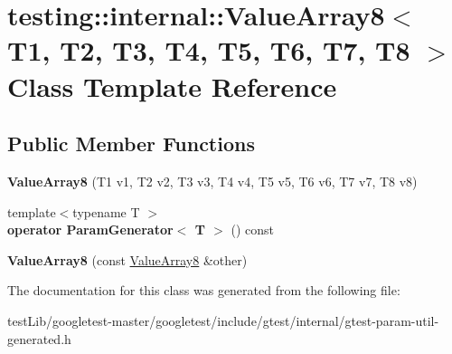 \hypertarget{classtesting_1_1internal_1_1ValueArray8}{}\section{testing\+:\+:internal\+:\+:Value\+Array8$<$ T1, T2, T3, T4, T5, T6, T7, T8 $>$ Class Template Reference}
\label{classtesting_1_1internal_1_1ValueArray8}
\subsection*{Public Member Functions}
\begin{DoxyCompactItemize}
\item 
\mbox{\label{classtesting_1_1internal_1_1ValueArray8_aa935d771149e26694277b6b9a3f6f5d3}} 
{\bfseries Value\+Array8} (T1 v1, T2 v2, T3 v3, T4 v4, T5 v5, T6 v6, T7 v7, T8 v8)
\item 
\mbox{\label{classtesting_1_1internal_1_1ValueArray8_a265f6e8bc6ceede7e673682ddebb82c5}} 
{\footnotesize template$<$typename T $>$ }\\{\bfseries operator Param\+Generator$<$ T $>$} () const
\item 
\mbox{\label{classtesting_1_1internal_1_1ValueArray8_aa2d57c811dc60c02a487c36b4b6b4464}} 
{\bfseries Value\+Array8} (const \hyperlink{classtesting_1_1internal_1_1ValueArray8}{Value\+Array8} \&other)
\end{DoxyCompactItemize}


The documentation for this class was generated from the following file\+:\begin{DoxyCompactItemize}
\item 
test\+Lib/googletest-\/master/googletest/include/gtest/internal/gtest-\/param-\/util-\/generated.\+h\end{DoxyCompactItemize}
